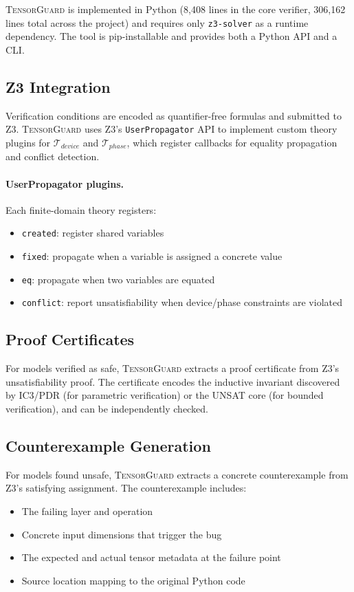 \documentclass[10pt]{article}
\newcommand{\tguard}{\textsc{TensorGuard}}
\newcommand{\Tdevice}{\mathcal{T}_{\mathit{device}}}
\newcommand{\Tphase}{\mathcal{T}_{\mathit{phase}}}
\theoremstyle{plain}
\theoremstyle{definition}
\theoremstyle{remark}
\begin{document}
\tguard{} is implemented in Python (8{,}408 lines in the core
verifier, 306{,}162 lines total across the project) and requires
only \texttt{z3-solver} as a runtime dependency.  The tool is
pip-installable and provides both a Python API and a CLI.

\subsection{Z3 Integration}

Verification conditions are encoded as quantifier-free formulas and
submitted to Z3.  \tguard{} uses Z3's \texttt{UserPropagator} API to
implement custom theory plugins for $\Tdevice$ and $\Tphase$, which
register callbacks for equality propagation and conflict detection.

\paragraph{UserPropagator plugins.}
Each finite-domain theory registers:
\begin{itemize}[nosep]
  \item \texttt{created}: register shared variables
  \item \texttt{fixed}: propagate when a variable is assigned a
    concrete value
  \item \texttt{eq}: propagate when two variables are equated
  \item \texttt{conflict}: report unsatisfiability when device/phase
    constraints are violated
\end{itemize}

\subsection{Proof Certificates}

For models verified as safe, \tguard{} extracts a proof certificate
from Z3's unsatisfiability proof.  The certificate encodes the
inductive invariant discovered by IC3/PDR (for parametric
verification) or the UNSAT core (for bounded verification), and can
be independently checked.

\subsection{Counterexample Generation}

For models found unsafe, \tguard{} extracts a concrete
counterexample from Z3's satisfying assignment.  The counterexample
includes:
\begin{itemize}[nosep]
  \item The failing layer and operation
  \item Concrete input dimensions that trigger the bug
  \item The expected and actual tensor metadata at the failure point
  \item Source location mapping to the original Python code
\end{itemize}
\end{document}

